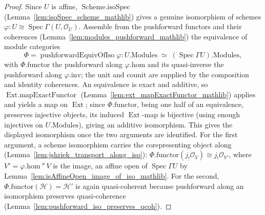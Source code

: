 \begin{proof}
  Since \(U\) is affine, \(\operatorname{Scheme.isoSpec}\) (Lemma~\ref{lem:isoSpec_scheme_mathlib})
  gives a genuine isomorphism of schemes \(\varphi : U \cong \operatorname{Spec}\Gamma(U, \mathcal{O}_U)\).
  Assemble from the pushforward functors and their coherences
  (Lemma~\ref{lem:modules_pushforward_mathlib}) the equivalence of module categories
  \[
    \Phi = \operatorname{pushforwardEquivOfIso}\varphi :
      U.\mathrm{Modules} \;\simeq\; (\operatorname{Spec}\Gamma U).\mathrm{Modules},
  \]
  with \(\Phi.\mathrm{functor}\) the pushforward along \(\varphi.\mathrm{hom}\) and its quasi-inverse the
  pushforward along \(\varphi.\mathrm{inv}\); the unit and counit are supplied by the composition and
  identity coherences. An equivalence is exact and additive, so
  \(\operatorname{Ext.mapExactFunctor}\) (Lemma~\ref{lem:ext_mapExactFunctor_mathlib}) applies and
  yields a map on \(\operatorname{Ext}\); since \(\Phi.\mathrm{functor}\), being one half of an
  equivalence, preserves injective objects, its induced \(\operatorname{Ext}\)-map is bijective
  (using enough injectives on \(U.\mathrm{Modules}\)), giving an additive isomorphism. This gives
  the displayed isomorphism once the two arguments are identified. For the first
  argument, a scheme isomorphism carries the corepresenting object along
  (Lemma~\ref{lem:jshriek_transport_along_iso}): \(\Phi.\mathrm{functor}(j_!\mathcal{O}_V) \cong
  j_!\mathcal{O}_{V'}\), where \(V' = \varphi.\mathrm{hom}\,{''}\,V\) is the image, an affine open of
  \(\operatorname{Spec}\Gamma U\) by Lemma~\ref{lem:isAffineOpen_image_of_iso_mathlib}. For the second,
  \(\Phi.\mathrm{functor}(\mathcal{H}) = \mathcal{H}'\) is again quasi-coherent because pushforward along
  an isomorphism preserves quasi-coherence (Lemma~\ref{lem:pushforward_iso_preserves_qcoh}).
\end{proof}

